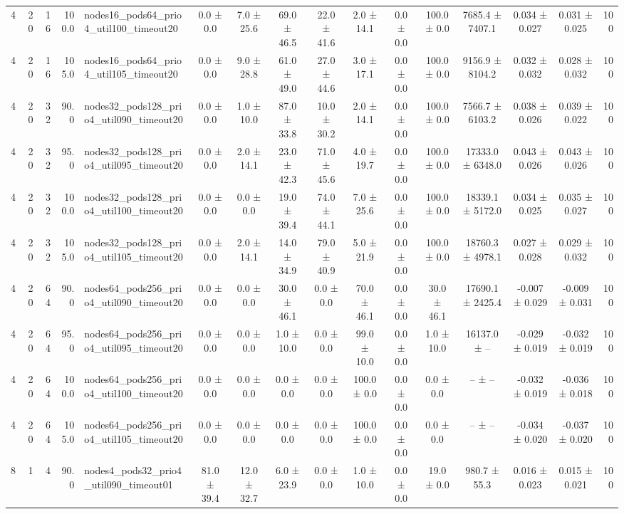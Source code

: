 \begin{tabular}{r r r r l c c c c c c c c c c r}
4 & 20 & 16 & 100.0 & nodes16\_pods64\_prio4\_util100\_timeout20 & 0.0 ± 0.0 & 7.0 ± 25.6 & 69.0 ± 46.5 & 22.0 ± 41.6 & 2.0 ± 14.1 & 0.0 ± 0.0 & 100.0 ± 0.0 & 7685.4 ± 7407.1 & 0.034 ± 0.027 & 0.031 ± 0.025 & 100 \\
4 & 20 & 16 & 105.0 & nodes16\_pods64\_prio4\_util105\_timeout20 & 0.0 ± 0.0 & 9.0 ± 28.8 & 61.0 ± 49.0 & 27.0 ± 44.6 & 3.0 ± 17.1 & 0.0 ± 0.0 & 100.0 ± 0.0 & 9156.9 ± 8104.2 & 0.032 ± 0.032 & 0.028 ± 0.032 & 100 \\
4 & 20 & 32 & 90.0 & nodes32\_pods128\_prio4\_util090\_timeout20 & 0.0 ± 0.0 & 1.0 ± 10.0 & 87.0 ± 33.8 & 10.0 ± 30.2 & 2.0 ± 14.1 & 0.0 ± 0.0 & 100.0 ± 0.0 & 7566.7 ± 6103.2 & 0.038 ± 0.026 & 0.039 ± 0.022 & 100 \\
4 & 20 & 32 & 95.0 & nodes32\_pods128\_prio4\_util095\_timeout20 & 0.0 ± 0.0 & 2.0 ± 14.1 & 23.0 ± 42.3 & 71.0 ± 45.6 & 4.0 ± 19.7 & 0.0 ± 0.0 & 100.0 ± 0.0 & 17333.0 ± 6348.0 & 0.043 ± 0.026 & 0.043 ± 0.026 & 100 \\
4 & 20 & 32 & 100.0 & nodes32\_pods128\_prio4\_util100\_timeout20 & 0.0 ± 0.0 & 0.0 ± 0.0 & 19.0 ± 39.4 & 74.0 ± 44.1 & 7.0 ± 25.6 & 0.0 ± 0.0 & 100.0 ± 0.0 & 18339.1 ± 5172.0 & 0.034 ± 0.025 & 0.035 ± 0.027 & 100 \\
4 & 20 & 32 & 105.0 & nodes32\_pods128\_prio4\_util105\_timeout20 & 0.0 ± 0.0 & 2.0 ± 14.1 & 14.0 ± 34.9 & 79.0 ± 40.9 & 5.0 ± 21.9 & 0.0 ± 0.0 & 100.0 ± 0.0 & 18760.3 ± 4978.1 & 0.027 ± 0.028 & 0.029 ± 0.032 & 100 \\
4 & 20 & 64 & 90.0 & nodes64\_pods256\_prio4\_util090\_timeout20 & 0.0 ± 0.0 & 0.0 ± 0.0 & 30.0 ± 46.1 & 0.0 ± 0.0 & 70.0 ± 46.1 & 0.0 ± 0.0 & 30.0 ± 46.1 & 17690.1 ± 2425.4 & -0.007 ± 0.029 & -0.009 ± 0.031 & 100 \\
4 & 20 & 64 & 95.0 & nodes64\_pods256\_prio4\_util095\_timeout20 & 0.0 ± 0.0 & 0.0 ± 0.0 & 1.0 ± 10.0 & 0.0 ± 0.0 & 99.0 ± 10.0 & 0.0 ± 0.0 & 1.0 ± 10.0 & 16137.0 ± -- & -0.029 ± 0.019 & -0.032 ± 0.019 & 100 \\
4 & 20 & 64 & 100.0 & nodes64\_pods256\_prio4\_util100\_timeout20 & 0.0 ± 0.0 & 0.0 ± 0.0 & 0.0 ± 0.0 & 0.0 ± 0.0 & 100.0 ± 0.0 & 0.0 ± 0.0 & 0.0 ± 0.0 & -- ± -- & -0.032 ± 0.019 & -0.036 ± 0.018 & 100 \\
4 & 20 & 64 & 105.0 & nodes64\_pods256\_prio4\_util105\_timeout20 & 0.0 ± 0.0 & 0.0 ± 0.0 & 0.0 ± 0.0 & 0.0 ± 0.0 & 100.0 ± 0.0 & 0.0 ± 0.0 & 0.0 ± 0.0 & -- ± -- & -0.034 ± 0.020 & -0.037 ± 0.020 & 100 \\
8 & 1 & 4 & 90.0 & nodes4\_pods32\_prio4\_util090\_timeout01 & 81.0 ± 39.4 & 12.0 ± 32.7 & 6.0 ± 23.9 & 0.0 ± 0.0 & 1.0 ± 10.0 & 0.0 ± 0.0 & 19.0 ± 0.0 & 980.7 ± 55.3 & 0.016 ± 0.023 & 0.015 ± 0.021 & 100 \\

\end{tabular}
